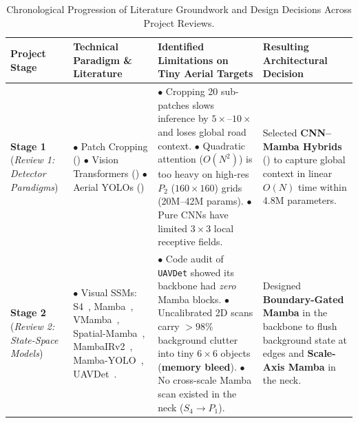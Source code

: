 \documentclass[11pt,a4paper]{article}
\begin{document}
\begin{table}[H]
\centering
\caption{Chronological Progression of Literature Groundwork and Design Decisions Across Project Reviews.}
\label{tab:review_journey}
\renewcommand{\arraystretch}{1.12}
\footnotesize
\begin{tabular}{p{2.2cm} p{3.8cm} p{4.6cm} p{3.8cm}}
\toprule
\textbf{Project Stage} & \textbf{Technical Paradigm \& Literature} & \textbf{Identified Limitations on Tiny Aerial Targets} & \textbf{Resulting Architectural Decision} \\ \midrule
\textbf{Stage 1} \newline (\emph{Review 1: Detector Paradigms}) & 
$\bullet$ Patch Cropping (\cite{yang2019clusdet,li2020dmnet,yang2022querydet,yuan2023cfinet,akyon2022sahi}) \newline
$\bullet$ Vision Transformers (\cite{carion2020detr,zhu2020deformabledetr,rao2021dynamicvit,lv2024rtdetr,zhang2025uavdetr,chen2025lgidetr}) \newline
$\bullet$ Aerial YOLOs (\cite{zhang2023droneyolo,zhang2024ffcayolo,wang2024mffci,li2026ludyolo,chen2025slyolo}) &
$\bullet$ Cropping 20 sub-patches slows inference by $5\times$--$10\times$ and loses global road context. \newline
$\bullet$ Quadratic attention ($O(N^2)$) is too heavy on high-res $P_2$ ($160\times 160$) grids (20M--42M params). \newline
$\bullet$ Pure CNNs have limited $3\times 3$ local receptive fields. &
Selected \textbf{CNN--Mamba Hybrids} (\cite{gu2022s4,gu2023mamba,wang2024mambayolo,yang2026uavdet}) to capture global context in linear $O(N)$ time within 4.8M parameters. \\ \midrule

\textbf{Stage 2} \newline (\emph{Review 2: State-Space Models}) &
$\bullet$ Visual SSMs: S4~\cite{gu2022s4}, Mamba~\cite{gu2023mamba}, VMamba~\cite{liu2024vmamba}, Spatial-Mamba~\cite{xiao2024spatialmamba}, MambaIRv2~\cite{guo2025mambairv2}, Mamba-YOLO~\cite{wang2024mambayolo}, UAVDet~\cite{yang2026uavdet}. &
$\bullet$ Code audit of \texttt{UAVDet} showed its backbone had \emph{zero} Mamba blocks. \newline
$\bullet$ Uncalibrated 2D scans carry $>98\%$ background clutter into tiny $6\times 6$ objects (\textbf{memory bleed}). \newline
$\bullet$ No cross-scale Mamba scan existed in the neck ($S_4 \rightarrow P_1$). &
Designed \textbf{Boundary-Gated Mamba} in the backbone to flush background state at edges and \textbf{Scale-Axis Mamba} in the neck. \\ \midrule


\end{tabular}
\end{table}
\end{document}
